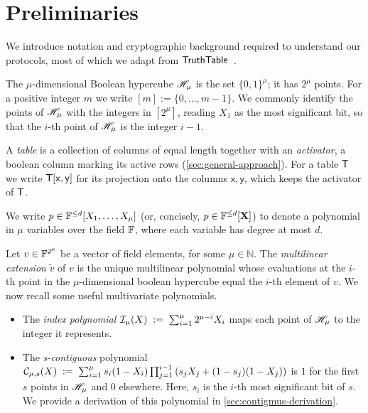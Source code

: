 \doclearpage
\section{Preliminaries}
\label{sec:prelims}

We introduce notation and cryptographic background required to understand our protocols, most of which we adapt from $\mathsf{TruthTable}$~\cite{cryptoeprint:2026/1260}.

 The $\mu$-dimensional Boolean hypercube $\mathscr{H}_{\mu}$ is the set $\{0,1\}^\mu$; it has $2^\mu$ points. For a positive integer $m$ we write $[m] := \{0, \dots, m-1\}$. We commonly identify the points of $\mathscr{H}_{\mu}$ with the integers in $[2^\mu]$, reading $X_1$ as the most significant bit, so that the $i$-th point of $\mathscr{H}_{\mu}$ is the integer $i-1$.

 A \emph{table} is a collection of columns of equal length together with an \emph{activator}, a boolean column marking its active rows (\cref{sec:general-approach}). For a table $\mathsf{T}$ we write $\mathsf{T}[\mathsf{x}, \mathsf{y}]$ for its projection onto the columns $\mathsf{x}, \mathsf{y}$, which keeps the activator of $\mathsf{T}$.

We write $p \in \mathbb{F}^{\le d}[X_1,\dots,X_\mu]$ (or, concisely, $p \in \mathbb{F}^{\le d}[\mathbf{X}]$) to denote a polynomial in $\mu$ variables over the field $\mathbb{F}$, where each variable has degree at most $d$. 


Let $v \in \mathbb{F}^{2^\mu}$ be a vector of field elements, for some $\mu \in \mathbb{N}$.
The \emph{multilinear extension} $\tilde{v}$ of $v$ is the unique multilinear polynomial whose evaluations at the $i$-th point in the $\mu$-dimensional boolean hypercube equal the $i$-th element of $v$.
We now recall some useful multivariate polynomials.
\begin{itemize}[nosep]
    \item The \emph{index polynomial} 
        $ \mathcal{I}_{\mu}(X) \;:=\; \sum_{i=1}^{\mu} 2^{\mu-i} X_i
        $
        maps each point of $\mathscr{H}_{\mu}$ to the integer it represents.
    \item The \emph{s-contiguous} polynomial
        $
        \mathcal{C}_{\mu, s}(X) \;:=\; \sum_{i=1}^{\mu} s_i(1 - X_i) \prod_{j=1}^{i-1} \left(s_jX_j + (1 - s_j)(1 - X_j)\right)   
        $ is $1$ for the first $s$ points in $\mathscr{H}_{\mu}$ and $0$ elsewhere. Here, $s_i$ is the $i$-th most significant bit of $s$. We provide a derivation of this polynomial in \cref{sec:contigmus-derivation}.
\end{itemize}

